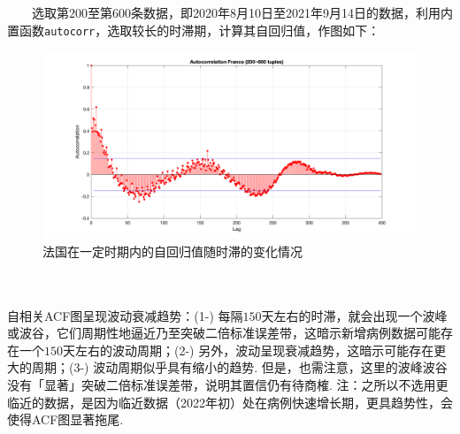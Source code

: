 \documentclass[a4paper, titlepage]{article}
\begin{document}
    　　选取第$200$至第$600$条数据，即2020年8月10日至2021年9月14日的数据，利用内置函数\texttt{autocorr}，选取较长的时滞期，计算其自回归值，作图如下：\\
    \begin{minipage}{\textwidth}
        \begin{figure}[H]
            \centering
            \includegraphics[width=\textwidth]{./images/France_ACF.png}
            \vspace{-3em}
            \caption{法国在一定时期内的自回归值随时滞的变化情况}
            \label{images:France_ACF}
        \end{figure}
    \end{minipage}\\\quad\\
    自相关ACF图呈现波动衰减趋势：(1-) 每隔$150$天左右的时滞，就会出现一个波峰或波谷，它们周期性地逼近乃至突破二倍标准误差带，这暗示新增病例数据可能存在一个$150$天左右的波动周期；(2-) 另外，波动呈现衰减趋势，这暗示可能存在更大的周期；(3-) 波动周期似乎具有缩小的趋势. 但是，也需注意，这里的波峰波谷没有「显著」突破二倍标准误差带，说明其置信仍有待商榷. {\kaishu 注：之所以不选用更临近的数据，是因为临近数据（2022年初）处在病例快速增长期，更具趋势性，会使得ACF图显著拖尾.}
\end{document}
